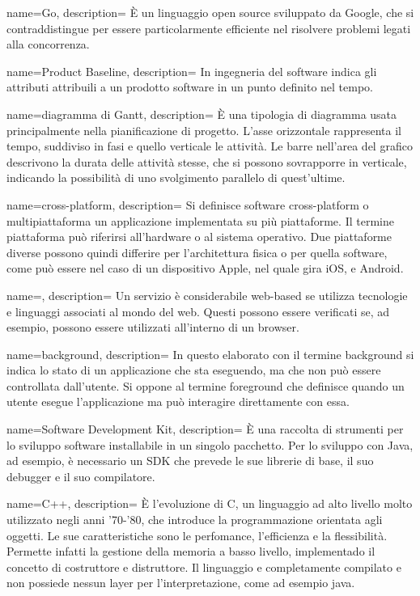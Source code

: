 {
  name=Go,
  description={ È un linguaggio open source sviluppato da Google, che si contraddistingue per essere particolarmente efficiente nel
  risolvere problemi legati alla concorrenza.}
}


{
  name=Product Baseline,
  description={ In ingegneria del software indica gli attributi attribuili a un prodotto software in un punto definito nel tempo. }
}

{
  name=diagramma di Gantt,
  description={ È una tipologia di diagramma usata principalmente nella pianificazione di progetto. L'asse orizzontale rappresenta il tempo, suddiviso in fasi e quello
  verticale le attività. Le barre nell'area del grafico descrivono la durata delle attività stesse, che si possono sovrapporre in verticale,
  indicando la possibilità di uno svolgimento parallelo di quest'ultime.}
}

{
  name=cross-platform,
  description={ Si definisce software cross-platform o multipiattaforma un applicazione implementata su più piattaforme. Il termine
  piattaforma può riferirsi all'hardware o al sistema operativo. Due piattaforme diverse possono quindi differire per l'architettura fisica
  o per quella software, come può essere nel caso di un dispositivo Apple, nel quale gira \gls{iOS}, e \gls{Android}. }
}

{
  name=,
  description={ Un servizio è considerabile web-based se utilizza tecnologie e linguaggi associati al mondo del web. Questi possono essere
  verificati se, ad esempio, possono essere utilizzati all'interno di un browser.}
}

{
  name=background,
  description={ In questo elaborato con il termine background si indica lo stato di un applicazione che sta eseguendo, ma che non
  può essere controllata dall'utente. Si oppone al termine foreground che definisce quando un utente esegue l'applicazione ma può
  interagire direttamente con essa.  }
}

{
  name=Software Development Kit,
  description={ È una raccolta di strumenti per lo sviluppo software installabile in un singolo pacchetto. Per lo sviluppo con Java, ad
  esempio, è necessario un SDK che prevede le sue librerie di base, il suo debugger e il suo compilatore. }
}


{
  name=C++,
  description={ È l'evoluzione di C, un linguaggio ad alto livello molto utilizzato negli anni '70-'80, che introduce la programmazione
  orientata agli oggetti. Le sue caratteristiche sono le perfomance, l'efficienza e la flessibilità. Permette infatti la gestione della
  memoria a basso livello, implementado il concetto di costruttore e distruttore. Il linguaggio e completamente compilato e non possiede
  nessun layer per l'interpretazione, come ad esempio \gls{java}.}
}


